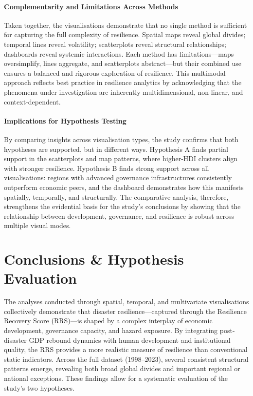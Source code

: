 \documentclass[conference]{IEEEtran}
\begin{document}
\paragraph{Complementarity and Limitations Across Methods}
Taken together, the visualisations demonstrate that no single method is sufficient for capturing the full complexity of resilience. Spatial maps reveal global divides; temporal lines reveal volatility; scatterplots reveal structural relationships; dashboards reveal systemic interactions. Each method has limitations—maps oversimplify, lines aggregate, and scatterplots abstract—but their combined use ensures a balanced and rigorous exploration of resilience. This multimodal approach reflects best practice in resilience analytics by acknowledging that the phenomena under investigation are inherently multidimensional, non-linear, and context-dependent.

\paragraph{Implications for Hypothesis Testing}
By comparing insights across visualisation types, the study confirms that both hypotheses are supported, but in different ways. Hypothesis A finds partial support in the scatterplots and map patterns, where higher-HDI clusters align with stronger resilience. Hypothesis B finds strong support across all visualisations: regions with advanced governance infrastructures consistently outperform economic peers, and the dashboard demonstrates how this manifests spatially, temporally, and structurally. The comparative analysis, therefore, strengthens the evidential basis for the study’s conclusions by showing that the relationship between development, governance, and resilience is robust across multiple visual modes. 

\section{Conclusions \& Hypothesis Evaluation}
\noindent
The analyses conducted through spatial, temporal, and multivariate visualisations collectively demonstrate that disaster resilience—captured through the Resilience Recovery Score (RRS)—is shaped by a complex interplay of economic development, governance capacity, and hazard exposure. By integrating post-disaster GDP rebound dynamics with human development and institutional quality, the RRS provides a more realistic measure of resilience than conventional static indicators. Across the full dataset (1998–2023), several consistent structural patterns emerge, revealing both broad global divides and important regional or national exceptions. These findings allow for a systematic evaluation of the study’s two hypotheses.
\end{document}
